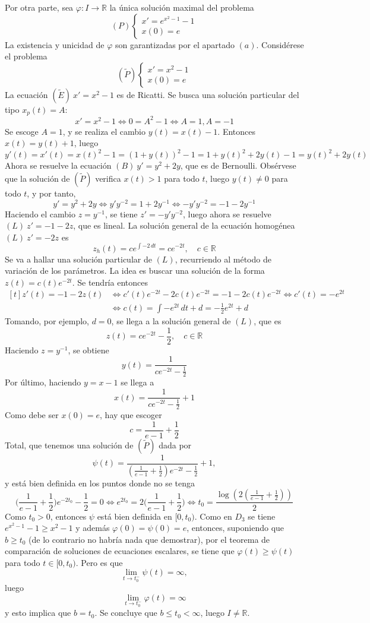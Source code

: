 \documentclass[11pt]{report}
\newcommand{\R}{\mathbb R}
\begin{document}
\begin{itemize}
Por otra parte, sea $\varphi \colon I \to \R$ la única solución maximal del problema
\[(P) \begin{cases}
    x'=e^{x^2-1}-1 \\
    x(0)=e
\end{cases}\]
La existencia y unicidad de $\varphi$ son garantizadas por el apartado $(a)$. Considérese el problema
\[(\widetilde{P}) \begin{cases}
    x'=x^2-1 \\
    x(0)=e
\end{cases}\]
La ecuación $(\widetilde{E}) \ x'=x^2-1$ es de Ricatti. Se busca una solución particular del tipo $x_p(t)=A$:
\[x'=x^2-1 \iff 0 = A^2-1 \iff A=1,A=-1\]
Se escoge $A=1$, y se realiza el cambio $y(t)=x(t)-1$. Entonces $x(t)=y(t)+1$, luego
\[y'(t)=x'(t)=x(t)^2-1=(1+y(t))^2-1=1+y(t)^2+2y(t)-1=y(t)^2+2y(t)\]
Ahora se resuelve la ecuación $(B) \ y'=y^2+2y$, que es de Bernoulli. Obsérvese que la solución de $(\widetilde{P})$ verifica $x(t)>1$ para todo $t$, luego $y(t) \neq 0$ para todo $t$, y por tanto,
\[y'=y^2+2y \iff y'y^{-2}=1+2y^{-1} \iff -y'y^{-2}=-1-2y^{-1}\]
Haciendo el cambio $z=y^{-1}$, se tiene $z'=-y'y^{-2}$, luego ahora se resuelve $(L) \ z'=-1-2z$, que es lineal. La solución general de la ecuación homogénea $(L) \ z'=-2z$ es
\[z_h(t)=ce^{\int-2\, dt} = ce^{-2t}, \quad c \in \R\]
Se va a hallar una solución particular de $(L)$, recurriendo al método de variación de los parámetros. La idea es buscar una solución de la forma $z(t)=c(t)e^{-2t}$. Se tendría entonces
\[
\begin{aligned}[t]
    z'(t)=-1-2z(t) &\iff c'(t)e^{-2t}-2c(t)e^{-2t} = -1-2c(t)e^{-2t} \iff c'(t)=-e^{2t} \\
    &\iff c(t)=\int-e^{2t}\, dt+d=-\frac{1}{2}e^{2t}+d
\end{aligned}
\]
Tomando, por ejemplo, $d=0$, se llega a la solución general de $(L)$, que es
\[z(t)=ce^{-2t}-\frac{1}{2}, \quad c \in \R\]
Haciendo $z=y^{-1}$, se obtiene
\[y(t)=\frac{1}{ce^{-2t}-\frac{1}{2}}\]
Por último, haciendo $y=x-1$ se llega a
\[x(t)=\frac{1}{ce^{-2t}-\frac{1}{2}}+1\]
Como debe ser $x(0)=e$, hay que escoger
\[c=\frac{1}{e-1}+\frac{1}{2}\]
Total, que tenemos una solución de $(\widetilde{P})$ dada por
\[\psi(t)=\frac{1}{(\frac{1}{e-1}+\frac{1}{2})e^{-2t}-\frac{1}{2}}+1,\]
y está bien definida en los puntos donde no se tenga
\[\biggl(\frac{1}{e-1}+\frac{1}{2}\biggr)e^{-2t_0}-\frac{1}{2} = 0 \iff e^{2t_0} = 2\biggl(\frac{1}{e-1}+\frac{1}{2}\biggr) \iff t_0=\frac{\log(2(\frac{1}{e-1}+\frac{1}{2}))}{2}\]
Como $t_0 >0$, entonces $\psi$ está bien definida en $[0,t_0)$. Como en $D_3$ se tiene
$e^{x^2-1}-1 \geq x^2-1$
y además $\varphi(0)=\psi(0)=e$, entonces, suponiendo que $b \geq t_0$ (de lo contrario no habría nada que demostrar), por el teorema de comparación de soluciones de ecuaciones escalares, se tiene que $\varphi(t) \geq \psi(t)$ para todo $t \in [0,t_0)$. Pero es que 
\[\lim_{t \to t_0^{-}} \psi(t)=\infty,\]
luego
\[\lim_{t \to t_0^{-}} \varphi(t)=\infty\]
y esto implica que $b =t_0$. Se concluye que $b \leq t_0 < \infty$, luego $I \neq \R$.
\end{itemize}
\end{document}
